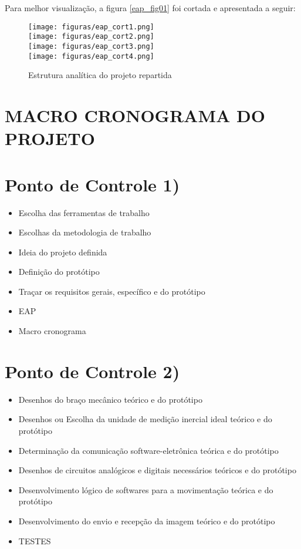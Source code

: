 Para melhor visualização, a figura \ref{eap_fig01} foi cortada e apresentada a seguir:

\begin{figure}[H]
	\centering
\begin{minipage}[c]{\textwidth}
\centering
  		\texttt{[image: figuras/eap\_cort1.png]} \\
  		\texttt{[image: figuras/eap\_cort2.png]} \\
  		\texttt{[image: figuras/eap\_cort3.png]} \\
 	    \texttt{[image: figuras/eap\_cort4.png]}
    	\caption{Estrutura analítica do projeto repartida}
    	\label{fig:sample_figure}
\end{minipage}
\end{figure}


\section{MACRO CRONOGRAMA DO PROJETO}

\section*{Ponto de Controle 1)}
\begin{itemize}
\item Escolha das ferramentas de trabalho
\item Escolhas da metodologia de trabalho
\item Ideia do projeto definida
\item Definição do protótipo
\item Traçar os requisitos gerais, específico e do protótipo
\item EAP 
\item Macro cronograma
\end{itemize}

\section*{Ponto de Controle 2)}
\begin{itemize}
\item Desenhos do braço mecânico teórico e do protótipo
\item Desenhos ou Escolha da unidade de medição inercial ideal teórico e do protótipo
\item Determinação da comunicação software-eletrônica teórica e do protótipo
\item Desenhos de circuitos analógicos e digitais necessários teóricos e do protótipo
\item Desenvolvimento lógico de softwares para a movimentação teórica e do protótipo
\item Desenvolvimento do envio e recepção da imagem teórico e do protótipo
\item TESTES
\end{itemize}

